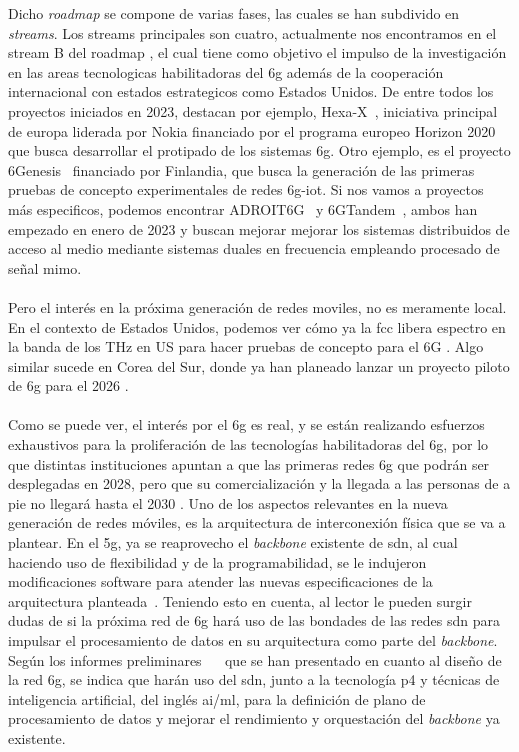 Dicho \textit{roadmap} se compone de varias fases, las cuales se han subdivido en \textit{streams}. Los streams principales son cuatro, actualmente nos encontramos en el stream B del roadmap \cite{eu6GFase2}, el cual tiene como objetivo el impulso de la investigación en las areas tecnologicas habilitadoras del \gls{6g} además de la cooperación internacional con estados estrategicos como Estados Unidos. De entre todos los proyectos iniciados en 2023, destacan por ejemplo, Hexa-X~\cite{9482430}, iniciativa principal de europa liderada por Nokia financiado por el programa europeo Horizon 2020 que busca desarrollar el protipado de los sistemas \gls{6g}. Otro ejemplo, es el proyecto 6Genesis~\cite{Katz2019} financiado por Finlandia, que busca la generación de las primeras pruebas de concepto experimentales de redes \gls{6g}-\gls{iot}. Si nos vamos a proyectos más especificos, podemos encontrar ADROIT6G~\cite{ADROIT6G} y 6GTandem~\cite{6GTandem}, ambos han empezado en enero de 2023 y buscan mejorar mejorar los sistemas distribuidos de acceso al medio mediante sistemas duales en frecuencia empleando procesado de señal \gls{mimo}.\\
\\
Pero el interés en la próxima generación de redes moviles, no es meramente local. En el contexto de Estados Unidos, podemos ver cómo ya la \gls{fcc} libera espectro en la banda de los THz en US para hacer pruebas de concepto para el 6G \cite{us6g}. Algo similar sucede en Corea del Sur, donde ya han planeado lanzar un proyecto piloto de \gls{6g} para el 2026 \cite{coreaSur6G}.\\
\\
Como se puede ver, el interés por el \gls{6g} es real, y se están realizando esfuerzos exhaustivos para la proliferación de las tecnologías habilitadoras del \gls{6g}, por lo que distintas instituciones apuntan a que las primeras redes \gls{6g} que podrán ser desplegadas en 2028, pero que su comercialización y la llegada a las personas de a pie no llegará hasta el 2030 \cite{Nguyen2022}. Uno de los aspectos relevantes en la nueva generación de redes móviles, es la arquitectura de interconexión física que se va a plantear. En el \gls{5g}, ya se reaprovecho el \textit{backbone} existente de \gls{sdn}, al cual haciendo uso de flexibilidad y de la programabilidad,  se le indujeron modificaciones software para atender las nuevas especificaciones de la arquitectura planteada~\cite{Li2018}. Teniendo esto en cuenta, al lector le pueden surgir dudas de si la próxima red de \gls{6g} hará uso de las bondades de las redes \gls{sdn} para impulsar el procesamiento de datos en su arquitectura como parte del \textit{backbone}. Según los informes preliminares \cite{Uusitalo2021}~\cite{6garch1}~\cite{6garch2} que se han presentado en cuanto al diseño de la red \gls{6g}, se indica que harán uso del \gls{sdn},  junto a la tecnología \gls{p4} y técnicas de inteligencia artificial, del inglés \gls{ai}/\gls{ml}, para la definición de plano de procesamiento de datos y mejorar el rendimiento y orquestación del \textit{backbone} ya existente.\\



